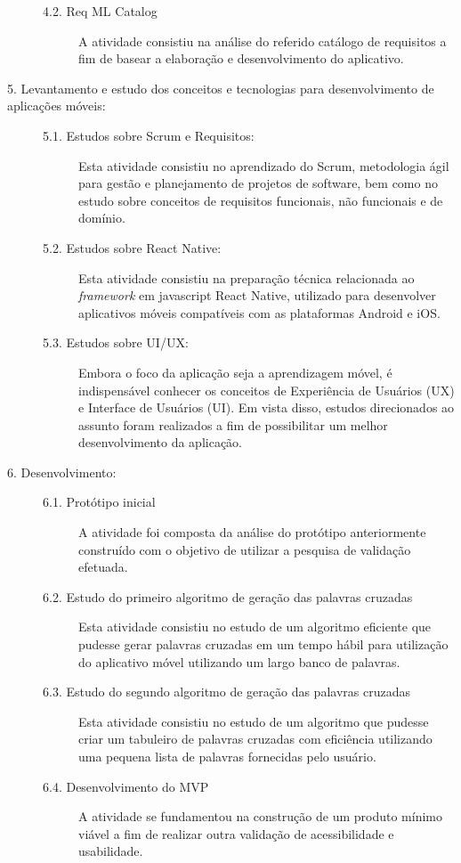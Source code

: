 \begin{description}
\begin{description}
    \item[4.2. Req ML Catalog]
    A atividade consistiu na análise do referido catálogo de requisitos a fim de basear a elaboração e desenvolvimento do aplicativo.
\end{description}


\item[5. Levantamento e estudo dos conceitos e tecnologias para desenvolvimento de aplicações móveis:]
\hfill

\begin{description}
\item[5.1. Estudos sobre Scrum e Requisitos:] Esta atividade consistiu no aprendizado do Scrum, metodologia ágil para gestão e planejamento de projetos de software, bem como no estudo sobre conceitos de requisitos funcionais, não funcionais e de domínio.

\item[5.2. Estudos sobre React Native:] Esta atividade consistiu na preparação técnica relacionada ao \textit{framework} em javascript React Native, utilizado para desenvolver aplicativos móveis compatíveis com as plataformas Android e iOS.

\item[5.3. Estudos sobre UI/UX:] Embora o foco da aplicação seja a aprendizagem móvel, é indispensável conhecer os conceitos de Experiência de Usuários (UX) e Interface de Usuários (UI). Em vista disso, estudos direcionados ao assunto foram realizados a fim de possibilitar um melhor desenvolvimento da aplicação.

\end{description}

\item[6. Desenvolvimento:]
\hfill

\begin{description}
    \item[6.1. Protótipo inicial]
    A atividade foi composta da análise do protótipo anteriormente construído com o objetivo de utilizar a pesquisa de validação efetuada.

    \item[6.2. Estudo do primeiro algoritmo de geração das palavras cruzadas]
    Esta atividade consistiu no estudo de um algoritmo eficiente que pudesse gerar palavras cruzadas em um tempo hábil para utilização do aplicativo móvel utilizando um largo banco de palavras.
    
    \item[6.3. Estudo do segundo algoritmo de geração das palavras cruzadas]
    Esta atividade consistiu no estudo de um algoritmo que pudesse criar um tabuleiro de palavras cruzadas com eficiência utilizando uma pequena lista de palavras fornecidas pelo usuário.
    
    \item[6.4. Desenvolvimento do MVP] 
    A atividade se fundamentou na construção de um produto mínimo viável a fim de realizar outra validação de acessibilidade e usabilidade.
\end{description}

\end{description}